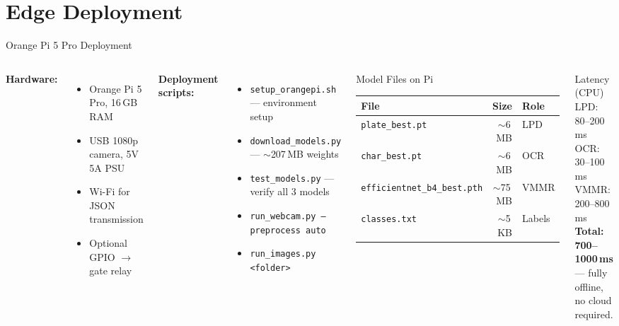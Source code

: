 \documentclass[aspectratio=169,11pt]{beamer}
\begin{document}
\section{Edge Deployment}

\begin{frame}{Orange Pi 5 Pro Deployment}
  \begin{columns}[T]
    \textbf{Hardware:}
    \begin{itemize}
      \item Orange Pi 5 Pro, 16\,GB RAM
      \item USB 1080p camera, 5V 5A PSU
      \item Wi-Fi for JSON transmission
      \item Optional GPIO $\rightarrow$ gate relay
    \end{itemize}
    \textbf{Deployment scripts:}
    \begin{itemize}
      \item \texttt{setup\_orangepi.sh} --- environment setup
      \item \texttt{download\_models.py} --- $\sim$207\,MB weights
      \item \texttt{test\_models.py} --- verify all 3 models
      \item \texttt{run\_webcam.py --preprocess auto}
      \item \texttt{run\_images.py <folder>}
    \end{itemize}
    \begin{block}{Model Files on Pi}
      \begin{tabular}{@{}lrl@{}}
        \toprule
        \textbf{File} & \textbf{Size} & \textbf{Role} \\
        \midrule
        \texttt{plate\_best.pt} & $\sim$6\,MB & LPD \\
        \texttt{char\_best.pt} & $\sim$6\,MB & OCR \\
        \texttt{efficientnet\_b4\_best.pth} & $\sim$75\,MB & VMMR \\
        \texttt{classes.txt} & $\sim$5\,KB & Labels \\
        \bottomrule
      \end{tabular}
    \end{block}
    \begin{exampleblock}{Latency (CPU)}
      LPD: 80--200\,ms \quad OCR: 30--100\,ms \quad VMMR: 200--800\,ms\\
      \textbf{Total: 700--1000\,ms} --- fully offline, no cloud required.
    \end{exampleblock}
  \end{columns}
\end{frame}
\end{document}
